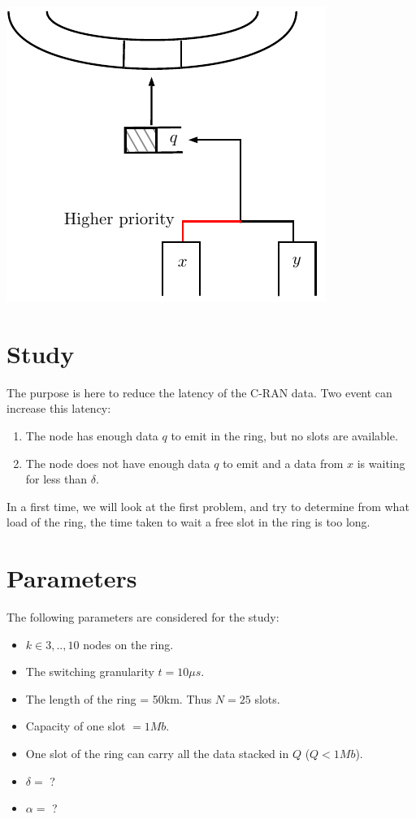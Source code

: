 \documentclass[a4paper,10pt]{article}
\begin{document}
\begin{center}   

      \includegraphics[scale=0.7]{insertion.pdf}

  
\end{center}

\section*{Study}
The purpose is here to reduce the latency of the C-RAN data. Two event can increase this latency: 
\begin{enumerate}
  \item The node has enough data $q$ to emit in the ring, but no slots are available.
 \item The node does not have enough data $q$ to emit and a data from $x$ is waiting for less than $\delta$.
\end{enumerate}

In a first time, we will look at the first problem, and try to determine from what load of the ring, the time taken to wait a free slot in the ring is too long.

\section*{Parameters}
The following parameters are considered for the study:
\begin{itemize}
 \item $k \in {3,..,10}$ nodes on the ring.
 \item The switching granularity $t = 10\mu s$. 
 \item The length of the ring = 50km. Thus $N = 25$ slots.
 \item Capacity of one slot $= 1Mb$.
 \item One slot of the ring can carry all the data stacked in $Q$ ($Q < 1Mb$).
 \item $\delta =$ ?
 \item $\alpha =$ ?
\end{itemize}
\end{document}
